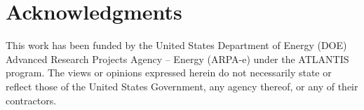 \documentclass[11pt]{article}
\begin{document}
\section*{Acknowledgments}
This work has been funded by the United States Department of Energy (DOE) Advanced Research Projects Agency – Energy (ARPA-e) under the ATLANTIS program. The views or opinions expressed herein do not necessarily state or reflect those of the United States Government, any agency thereof, or any of their contractors.


\end{document}
